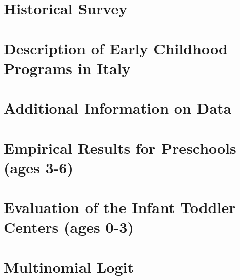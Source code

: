 \begin{appendices}

\section{Historical Survey}
\label{sec:survey}


\section{Description of Early Childhood Programs in Italy}
\label{sec:programdes}


\section{Additional Information on Data}
\label{sec:data-app}


\section{Empirical Results for Preschools (ages 3-6)}
\label{sec:results}


\section{Evaluation of the Infant Toddler Centers (ages 0-3)} \label{sec:ITC}

\label{sec:asilo_results}


\section{Multinomial Logit}
\label{sec:multi-logit}

\clearpage


%

\end{appendices}





